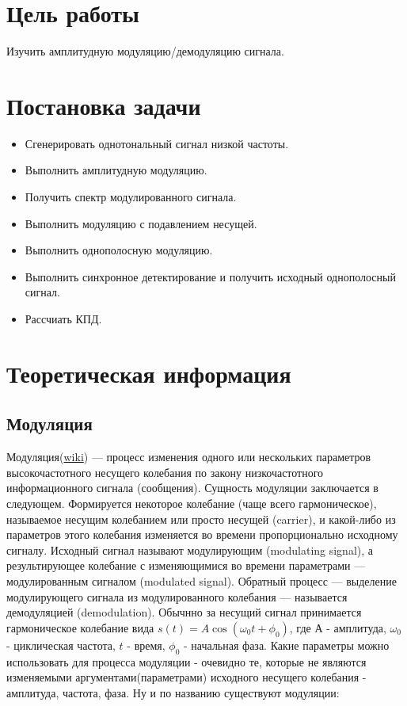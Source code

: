 






\section{Цель работы}
Изучить амплитудную модуляцию/демодуляцию сигнала.

\section{Постановка задачи}
\begin{itemize}
	\item Сгенерировать однотональный сигнал низкой частоты.
	\item Выполнить амплитудную модуляцию.
	\item Получить спектр модулированного сигнала.
	\item Выполнить модуляцию с подавлением несущей.
	\item Выполнить однополосную модуляцию.
	\item Выполнить синхронное детектирование и получить исходный однополосный сигнал.
	\item Рассчиать КПД.
\end{itemize}


\section{Теоретическая информация}
\subsection{Модуляция}
Модуляция(\href{https://ru.wikipedia.org/wiki/Модуляция}{wiki}) — процесс изменения одного или нескольких параметров высокочастотного несущего колебания по закону низкочастотного информационного сигнала (сообщения). Сущность модуляции заключается в следующем. Формируется некоторое колебание (чаще всего гармоническое), называемое несущим колебанием или просто несущей (carrier), и какой-либо из параметров этого колебания изменяется во времени пропорционально исходному сигналу. Исходный сигнал называют модулирующим (modulating signal), а результирующее колебание с изменяющимися во времени параметрами — модулированным сигналом (modulated signal). Обратный процесс — выделение модулирующего сигнала из модулированного колебания — называется демодуляцией (demodulation).
Обычнно за несущий сигнал принимается гармоническое колебание вида 
$ s(t) = A \cos(\omega_0 t + \phi_0) $, где $ А $ - амплитуда, $ \omega_0 $ - циклическая частота, $t$ - время, $ \phi_0 $ - начальная фаза. Какие параметры можно использовать для процесса модуляции - 
очевидно те, которые не являются изменяемыми аргументами(параметрами) исходного несущего колебания - амплитуда, частота, фаза. Ну и по названию существуют модуляции:

